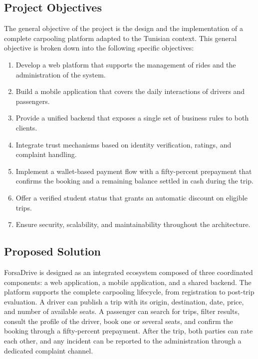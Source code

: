 \subsection{Project Objectives}

The general objective of the project is the design and the implementation of a complete carpooling platform adapted to the Tunisian context. This general objective is broken down into the following specific objectives:

\begin{enumerate}[noitemsep]
    \item Develop a web platform that supports the management of rides and the administration of the system.
    \item Build a mobile application that covers the daily interactions of drivers and passengers.
    \item Provide a unified backend that exposes a single set of business rules to both clients.
    \item Integrate trust mechanisms based on identity verification, ratings, and complaint handling.
    \item Implement a wallet-based payment flow with a fifty-percent prepayment that confirms the booking and a remaining balance settled in cash during the trip.
    \item Offer a verified student status that grants an automatic discount on eligible trips.
    \item Ensure security, scalability, and maintainability throughout the architecture.
\end{enumerate}

\subsection{Proposed Solution}

ForsaDrive is designed as an integrated ecosystem composed of three coordinated components: a web application, a mobile application, and a shared backend. The platform supports the complete carpooling lifecycle, from registration to post-trip evaluation. A driver can publish a trip with its origin, destination, date, price, and number of available seats. A passenger can search for trips, filter results, consult the profile of the driver, book one or several seats, and confirm the booking through a fifty-percent prepayment. After the trip, both parties can rate each other, and any incident can be reported to the administration through a dedicated complaint channel.

